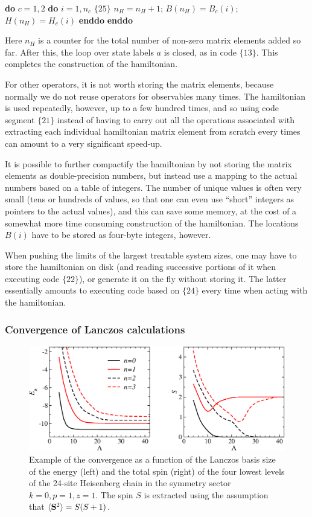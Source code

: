 \documentclass[draft,numberedheadings]{aipproc}
\newcommand{\code}{\null\vskip-2mm\noindent}
\newcommand{\br}{\hfill\break}
\newcommand{\cia}{\null\hskip5mm}
\newcommand{\cib}{\null\hskip10mm}
\newcommand{\cic}{\null\hskip15mm}
\begin{document}
{\code
\cia   {\bf do} $c=1,2$     \br
\cib       {\bf do} $i=1,n_c$          \hfill $\{25\}$\break                      
\cic           $n_H=n_H+1$; $B(n_H)=B_c(i)$; $H(n_H)=H_{c}(i)$  \br               
\cib       {\bf enddo}    \br
\cia    {\bf enddo}     
\code}

\noindent
Here $n_H$ is a counter for the total number of non-zero matrix elements added so far. After this, the loop over state labels $a$ is closed, as in code
$\{13\}$. This completes the construction of the hamiltonian.

For other operators, it is not worth storing the matrix elements, because normally we do not reuse operators for observables many times. The 
hamiltonian is used repeatedly, however, up to a few hundred times, and so using code segment $\{21\}$ instead of having to carry out all the 
operations associated with extracting each individual hamiltonian matrix element from scratch every times can amount to a very significant speed-up. 

It is possible to further compactify the hamiltonian by not storing the matrix elements as double-precision numbers, but instead use a mapping to 
the actual numbers based on a table of integers. The number of unique values is often very small (tens or hundreds of values, so that one can
even use ``short'' integers as pointers to the actual values), and this can save some memory, at the cost of a somewhat more time consuming 
construction of the hamiltonian. The locations $B(i)$ have to be stored as four-byte integers, however.

When pushing the limits of the largest treatable system sizes, one may have to store the hamiltonian on disk (and reading successive portions
of it when executing code $\{22\}$), or generate it on the fly without storing it. The latter essentially amounts to executing code based on $\{24\}$ 
every time when acting with the hamiltonian.

\subsubsection{Convergence of Lanczos calculations}

\begin{figure}
\includegraphics[width=12.25cm, clip]{es24.eps}
\caption{Example of the convergence as a function of the Lanczos basis size of the energy (left) and the total spin (right) of the four 
lowest levels of the 24-site Heisenberg chain in the symmetry sector $k=0,p=1,z=1$. The spin $S$ is extracted using the assumption
that $\langle {\bf S}^2\rangle = S(S+1)$.}
\label{es24}
\end{figure}
\end{document}
